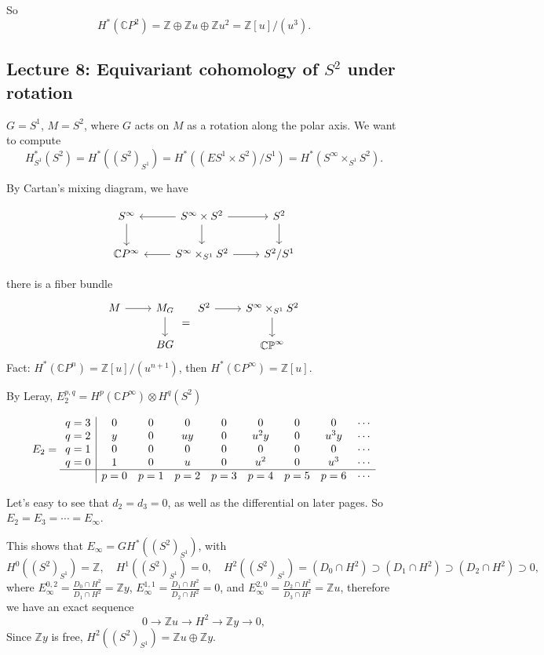 \documentclass{article}
\theoremstyle{mystyle}
\theoremstyle{remark}
\numberwithin{equation}{section}
\begin{document}
So 
$$H^*(\mathbb{C}P^2) = \mathbb{Z}\oplus \mathbb{Z}u\oplus \mathbb{Z}u^2 = \mathbb{Z}[u]/(u^3).$$


\subsection{Lecture 8: Equivariant cohomology of $S^2$ under rotation}

$G = S^1$, $M = S^2$, where $G$ acts on $M$ as a rotation along the polar axis. We want to compute 
$$H^*_{S^1}(S^2) = H^*((S^2)_{S^1}) = H^*((ES^1\times S^2)/S^1) = H^*(S^\infty \times_{S^1} S^2).$$

By Cartan's mixing diagram, we have

\begin{equation}\label{cartanS2}
\begin{tikzcd}
S^\infty\ar[d] & \ar[l] S^\infty \times S^2 \ar[d] \ar[r] & S^2 \ar[d]\\
\mathbb{C}P^\infty & \ar[l] S^\infty\times_{S^1} S^2 \ar[r] &  S^2/S^1\end{tikzcd}
\end{equation}

there is a fiber bundle 
$$\begin{tikzcd}
M \ar[r] &M_G\ar[d] \\& BG\end{tikzcd}
=
\begin{tikzcd}
S^2\ar[r] & S^\infty\times_{S^1}S^2 \ar[d] \\&\mathbb{CP}^\infty
\end{tikzcd}
$$
Fact: $H^*(\mathbb{C}P^n) = \mathbb{Z}[u]/(u^{n+1})$, then $H^*(\mathbb{C}P^\infty) = \mathbb{Z}[u]$. 

By Leray, $E_2^{p,q} = H^p(\mathbb{C}P^\infty)\otimes H^q(S^2)$ 


$$
E_2 = \begin{array}{c|cccccccc}
q=3 & 0 & 0 & 0 & 0 & 0 & 0 & 0 & \cdots \\
q=2 & y & 0 & uy & 0 & u^2y & 0 &  u^3 y & \cdots \\
q=1 & 0 & 0 & 0 & 0 & 0 & 0 & 0 & \cdots \\
q=0 & 1 & 0 & u & 0 & u^2 & 0& u^3 & \cdots \\
\hline
& p=0 & p=1 & p=2 & p=3 & p=4 & p=5 & p=6 & \cdots 
\end{array}
$$

Let's easy to see that $d_2=d_3=0$, as well as the differential on later pages. So $E_2=E_3=\cdots = E_\infty$.

This shows that $E_\infty  = GH^*((S^2)_{S^1})$, with
$$H^0((S^2)_{S^1}) = \mathbb{Z},\quad
H^1((S^2)_{S^1}) = 0,\quad
H^2((S^2)_{S^1}) = (D_0\cap H^2) \supset (D_1\cap H^2)\supset (D_2\cap H^2) \supset 0,
$$
where 
$E^{0,2}_\infty = \frac{D_0\cap H^2}{D_1\cap H^2} = \mathbb{Z}y$, 
$E^{1,1}_\infty = \frac{D_1\cap H^2}{D_2\cap H^2} = 0$, and $E^{2,0}_\infty = \frac{D_2\cap H^2}{D_3\cap H^2} = \mathbb{Z}u$, therefore we have an exact sequence
$$0\rightarrow \mathbb{Z}u\rightarrow H^2\rightarrow \mathbb{Z}y \rightarrow 0,$$
Since $\mathbb{Z}y$ is free, $H^2((S^2)_{S^1}) = \mathbb{Z}u\oplus \mathbb{Z}y$. 
\end{document}

